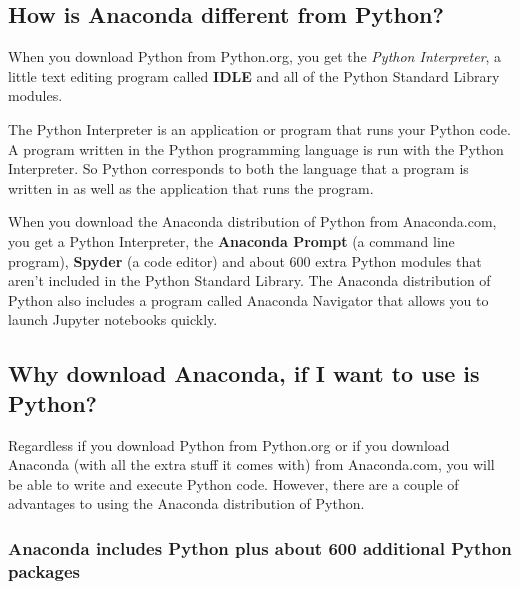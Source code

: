 \documentclass{book}
\begin{document}
    
        \hypertarget{how-is-anaconda-different-from-python}{%
\subsection{How is Anaconda different from
Python?}\label{how-is-anaconda-different-from-python}}

When you download Python from Python.org, you get the \emph{Python
Interpreter}, a little text editing program called \textbf{IDLE} and all
of the Python Standard Library modules.

The Python Interpreter is an application or program that runs your
Python code. A program written in the Python programming language is run
with the Python Interpreter. So Python corresponds to both the language
that a program is written in as well as the application that runs the
program.

When you download the Anaconda distribution of Python from Anaconda.com,
you get a Python Interpreter, the \textbf{Anaconda Prompt} (a command
line program), \textbf{Spyder} (a code editor) and about 600 extra
Python modules that aren't included in the Python Standard Library. The
Anaconda distribution of Python also includes a program called Anaconda
Navigator that allows you to launch Jupyter notebooks quickly.
    




    
        \hypertarget{why-download-anaconda-if-i-want-to-use-is-python}{%
\subsection{Why download Anaconda, if I want to use is
Python?}\label{why-download-anaconda-if-i-want-to-use-is-python}}

Regardless if you download Python from Python.org or if you download
Anaconda (with all the extra stuff it comes with) from Anaconda.com, you
will be able to write and execute Python code. However, there are a
couple of advantages to using the Anaconda distribution of Python.

\hypertarget{anaconda-includes-python-plus-about-600-additional-python-packages}{%
\subsubsection{Anaconda includes Python plus about 600 additional Python
packages}\label{anaconda-includes-python-plus-about-600-additional-python-packages}}
\end{document}
